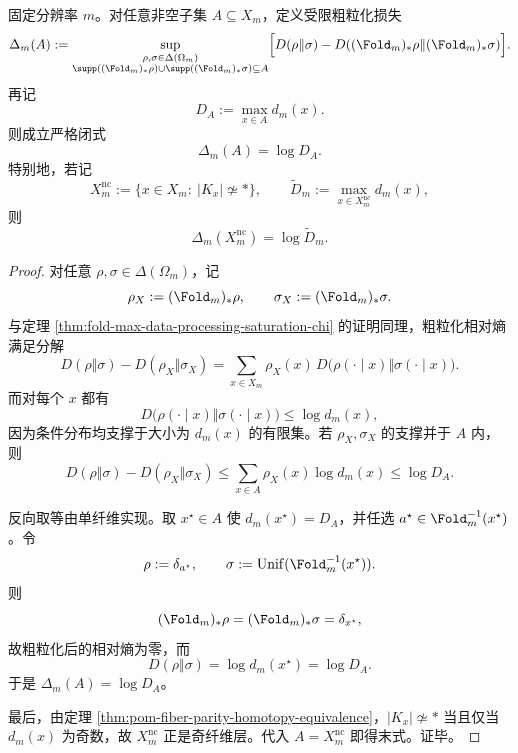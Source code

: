 \begin{theorem}[任意纤维族上的精确数据处理损失]\label{thm:conclusion-noncontractible-restricted-dpi-exact}
固定分辨率 \(m\)。对任意非空子集 \(A\subseteq X_m\)，定义受限粗粒化损失
\[
\Delta_m(A):=
\sup_{\substack{\rho,\sigma\in \Delta(\Omega_m)\\
\supp((\Fold_m)_\ast\rho)\cup \supp((\Fold_m)_\ast\sigma)\subseteq A}}
\Bigl[
D(\rho\Vert \sigma)-D((\Fold_m)_\ast\rho\Vert (\Fold_m)_\ast\sigma)
\Bigr].
\]
再记
\[
D_A:=\max_{x\in A}d_m(x).
\]
则成立严格闭式
\[
\Delta_m(A)=\log D_A.
\]
特别地，若记
\[
X_m^{\mathrm{nc}}:=\{x\in X_m:\ |K_x|\not\simeq *\},
\qquad
\widetilde D_m:=\max_{x\in X_m^{\mathrm{nc}}}d_m(x),
\]
则
\[
\Delta_m(X_m^{\mathrm{nc}})=\log \widetilde D_m.
\]
\end{theorem}
\begin{proof}
对任意 \(\rho,\sigma\in\Delta(\Omega_m)\)，记
\[
\rho_X:=(\Fold_m)_\ast\rho,\qquad \sigma_X:=(\Fold_m)_\ast\sigma.
\]
与定理 \ref{thm:fold-max-data-processing-saturation-chi} 的证明同理，粗粒化相对熵满足分解
\[
D(\rho\Vert \sigma)-D(\rho_X\Vert \sigma_X)
=
\sum_{x\in X_m}\rho_X(x)\,D\!\bigl(\rho(\cdot\mid x)\Vert \sigma(\cdot\mid x)\bigr).
\]
而对每个 \(x\) 都有
\[
D\!\bigl(\rho(\cdot\mid x)\Vert \sigma(\cdot\mid x)\bigr)\le \log d_m(x),
\]
因为条件分布均支撑于大小为 \(d_m(x)\) 的有限集。若 \(\rho_X,\sigma_X\) 的支撑并于 \(A\) 内，则
\[
D(\rho\Vert \sigma)-D(\rho_X\Vert \sigma_X)
\le
\sum_{x\in A}\rho_X(x)\log d_m(x)
\le \log D_A.
\]

反向取等由单纤维实现。取 \(x^\star\in A\) 使 \(d_m(x^\star)=D_A\)，并任选 \(a^\star\in \Fold_m^{-1}(x^\star)\)。令
\[
\rho:=\delta_{a^\star},
\qquad
\sigma:=\mathrm{Unif}(\Fold_m^{-1}(x^\star)).
\]
则
\[
(\Fold_m)_\ast\rho=(\Fold_m)_\ast\sigma=\delta_{x^\star},
\]
故粗粒化后的相对熵为零，而
\[
D(\rho\Vert \sigma)=\log d_m(x^\star)=\log D_A.
\]
于是 \(\Delta_m(A)=\log D_A\)。

最后，由定理 \ref{thm:pom-fiber-parity-homotopy-equivalence}，\(|K_x|\not\simeq *\) 当且仅当 \(d_m(x)\) 为奇数，故 \(X_m^{\mathrm{nc}}\) 正是奇纤维层。代入 \(A=X_m^{\mathrm{nc}}\) 即得末式。证毕。
\end{proof}

